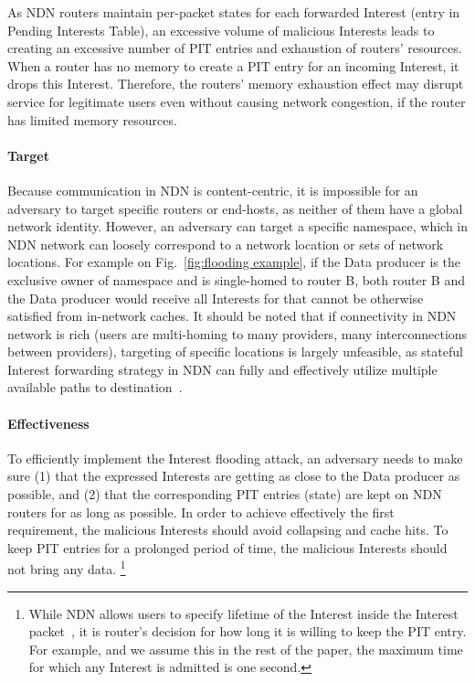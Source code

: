 As NDN routers maintain per-packet states for each forwarded Interest (entry in Pending Interests Table), an excessive volume of malicious Interests leads to creating an excessive number of PIT entries and exhaustion of routers' resources.
When a router has no memory to create a PIT entry for an incoming Interest, it drops this Interest.
Therefore, the routers' memory exhaustion effect may disrupt service for legitimate users even without causing network congestion, if the router has limited memory resources.

\paragraph{Target}

Because communication in NDN is content-centric, it is impossible for an adversary to target specific routers or end-hosts, as neither of them have a global network identity.
However, an adversary can target a specific namespace, which in NDN network can loosely correspond to a network location or sets of network locations.
For example on Fig.~\ref{fig:flooding example}, if the Data producer is the exclusive owner of  namespace and is single-homed to router B, both router B and the Data producer would receive all Interests for  that cannot be otherwise satisfied from in-network caches.
It should be noted that if connectivity in NDN network is rich (users are multi-homing to many providers, many interconnections between providers), targeting of specific locations is largely unfeasible, as stateful Interest forwarding strategy in NDN can fully and effectively utilize multiple available paths to destination~\cite{adaptive-forwarding}.


\paragraph{Effectiveness}

To efficiently implement the Interest flooding attack, an adversary needs to make sure (1) that the expressed Interests are getting as close to the Data producer as possible, and (2) that the corresponding PIT entries (state) are kept on NDN routers for as long as possible.
In order to achieve effectively the first requirement, the malicious Interests should avoid collapsing and cache hits.
To keep PIT entries for a prolonged period of time, the malicious Interests should not bring any data.%
\footnote{While NDN allows users to specify lifetime of the Interest inside the Interest packet~\cite{ndn-conext,ndn-tr}, it is router's decision for how long it is willing to keep the PIT entry.  For example, and we assume this in the rest of the paper, the maximum time for which any Interest is admitted is one second.} 

